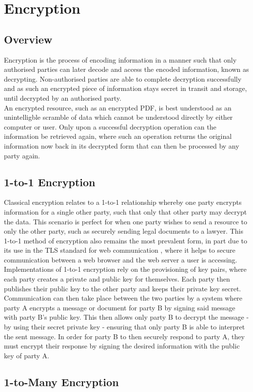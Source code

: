 \section{Encryption}
\label{sec:bkgr_encryption}

\subsection{Overview}
\label{sec:bkgr_enc_over}

Encryption is the process of encoding information in a manner such that only authorised parties can later decode and access the encoded information, known as decrypting. Non-authorised parties are able to complete decryption successfully and as such an encrypted piece of information stays secret in transit and storage, until decrypted by an authorised party.\\
An encrypted resource, such as an encrypted PDF, is best understood as an unintelligble scramble of data which cannot be understood directly by either computer or user. Only upon a successful decryption operation can the information be retrieved again, where such an operation returns the original information now back in its decrypted form that can then be processed by any party again.

\subsection{1-to-1 Encryption}
\label{sec:bkgr_enc_1to1}

Classical encryption relates to a 1-to-1 relationship whereby one party encrypts information for a single other party, such that only that other party may decrypt the data. This scenario is perfect for when one party wishes to send a resource to only the other party, such as securely sending legal documents to a lawyer. This 1-to-1 method of encryption also remains the most prevalent form, in part due to its use in the TLS standard for web communication \citep{Rescorla2018}, where it helps to secure communication between a web browser and the web server a user is accessing.\\
Implementations of 1-to-1 encryption rely on the provisioning of key pairs, where each party creates a private and public key for themselves. Each party then publishes their public key to the other party and keeps their private key secret.\\
Communication can then take place between the two parties by a system where party A encrypts a message or document for party B by signing said message with party B's public key. This then allows only party B to decrypt the message - by using their secret private key - ensuring that only party B is able to interpret the sent message. In order for party B to then securely respond to party A, they must encrypt their response by signing the desired information with the public key of party A.

\subsection{1-to-Many Encryption}
\label{sec:bkgr_enc_1toM}
